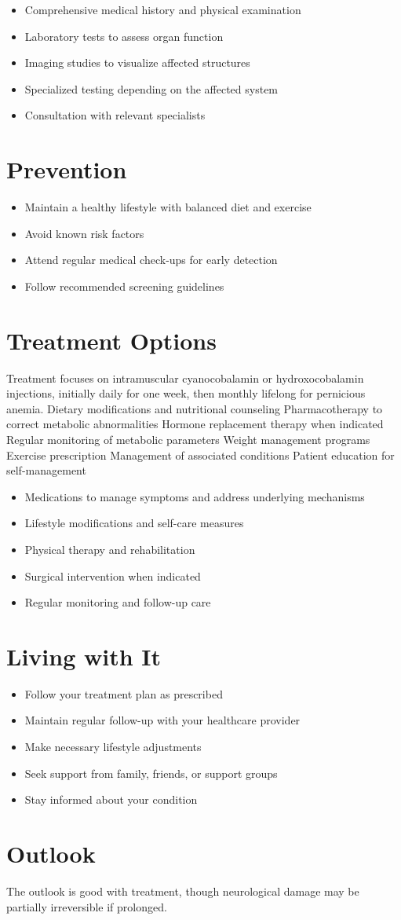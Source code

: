 \begin{itemize}[noitemsep]
  \item Comprehensive medical history and physical examination
  \item Laboratory tests to assess organ function
  \item Imaging studies to visualize affected structures
  \item Specialized testing depending on the affected system
  \item Consultation with relevant specialists
\end{itemize}
\section{Prevention}
\begin{itemize}[noitemsep]
  \item Maintain a healthy lifestyle with balanced diet and exercise
  \item Avoid known risk factors
  \item Attend regular medical check-ups for early detection
  \item Follow recommended screening guidelines
\end{itemize}
\section{Treatment Options}
Treatment focuses on intramuscular cyanocobalamin or hydroxocobalamin injections, initially daily for one week, then monthly lifelong for pernicious anemia. Dietary modifications and nutritional counseling Pharmacotherapy to correct metabolic abnormalities Hormone replacement therapy when indicated Regular monitoring of metabolic parameters Weight management programs Exercise prescription Management of associated conditions Patient education for self-management

\begin{itemize}[noitemsep]
  \item Medications to manage symptoms and address underlying mechanisms
  \item Lifestyle modifications and self-care measures
  \item Physical therapy and rehabilitation
  \item Surgical intervention when indicated
  \item Regular monitoring and follow-up care
\end{itemize}
\section{Living with It}
\begin{itemize}[noitemsep]
  \item Follow your treatment plan as prescribed
  \item Maintain regular follow-up with your healthcare provider
  \item Make necessary lifestyle adjustments
  \item Seek support from family, friends, or support groups
  \item Stay informed about your condition
\end{itemize}
\section{Outlook}
The outlook is good with treatment, though neurological damage may be partially irreversible if prolonged.
